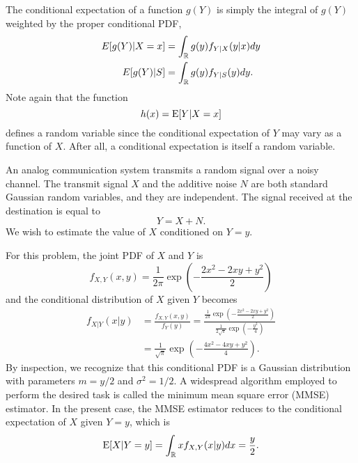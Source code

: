 The conditional expectation of a function $g(Y)$ is simply the integral of $g(Y)$ weighted by the proper conditional PDF,
\begin{align*}
E[g(Y) | X = x] &= \int_{\mathbb{R}} g(y) f_{Y|X} (y|x) dy \\
E[g(Y) | S] &= \int_{\mathbb{R}} g(y) f_{Y|S} (y) dy .
\end{align*}
Note again that the function
\begin{equation*}
h(x) = \mathrm{E} [Y | X=x]
\end{equation*}
defines a random variable since the conditional expectation of $Y$ may vary as a function of $X$.
After all, a conditional expectation is itself a random variable.

\begin{example}
An analog communication system transmits a random signal over a noisy channel.
The transmit signal $X$ and the additive noise $N$ are both standard Gaussian random variables, and they are independent.
The signal received at the destination is equal to
\begin{equation*}
Y = X + N .
\end{equation*}
We wish to estimate the value of $X$ conditioned on $Y = y$.

For this problem, the joint PDF of $X$ and $Y$ is
\begin{equation*}
f_{X,Y} (x,y) = \frac{1}{2 \pi}
\exp \left( - \frac{2 x^2 - 2 xy + y^2}{2}  \right)
\end{equation*}
and the conditional distribution of $X$ given $Y$ becomes
\begin{equation*}
\begin{split}
f_{X|Y} (x|y) &= \frac{f_{X,Y} (x,y)}{f_{Y} (y)}
= \frac{ \frac{1}{2 \pi} \exp \left( - \frac{2 x^2 - 2 xy + y^2}{2}  \right) }
{ \frac{1}{2 \sqrt{\pi}} \exp \left( - \frac{y^2}{4}  \right) } \\
&=\frac{1}{\sqrt{\pi}}
\exp \left( - \frac{4 x^2 - 4 xy + y^2}{4}  \right) .
\end{split}
\end{equation*}
By inspection, we recognize that this conditional PDF is a Gaussian distribution with parameters $m = y/2$ and $\sigma^2 = 1/2$.
A widespread algorithm employed to perform the desired task is called the minimum mean square error (MMSE) estimator.
In the present case, the MMSE estimator reduces to the conditional expectation of $X$ given $Y = y$, which is
\begin{equation*}
\mathrm{E} [X | Y = y] = \int_{\mathbb{R}} x f_{X,Y}(x|y) dx
= \frac{y}{2} .
\end{equation*}
\end{example}


